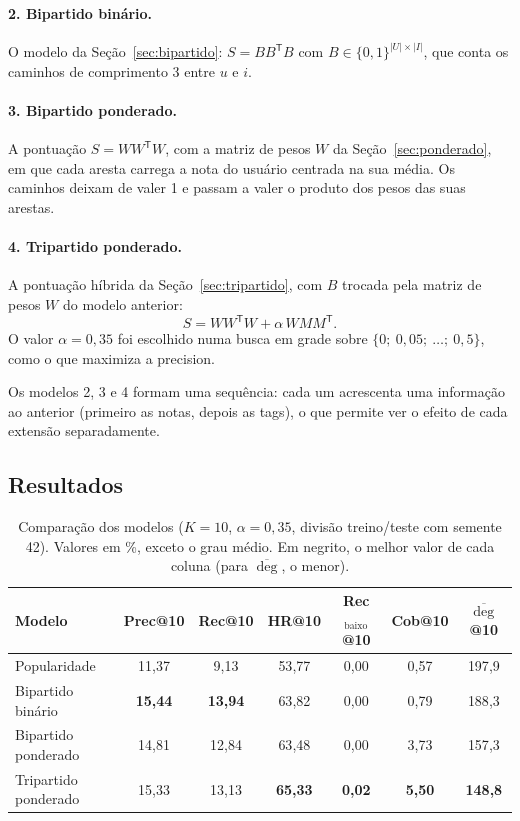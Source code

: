 \documentclass[12pt,a4paper]{article}
\theoremstyle{definition}
\begin{document}
\paragraph{2. Bipartido binário.}
O modelo da Seção~\ref{sec:bipartido}: $S = BB^{\mathsf T}B$ com
$B \in \{0,1\}^{|U| \times |I|}$, que conta os caminhos de comprimento 3
entre $u$ e $i$.

\paragraph{3. Bipartido ponderado.}
A pontuação $S = WW^{\mathsf T}W$, com a matriz de pesos $W$ da
Seção~\ref{sec:ponderado}, em que cada aresta carrega a nota do usuário
centrada na sua média. Os caminhos deixam de valer 1 e passam a valer o
produto dos pesos das suas arestas.

\paragraph{4. Tripartido ponderado.}
A pontuação híbrida da Seção~\ref{sec:tripartido}, com $B$ trocada pela
matriz de pesos $W$ do modelo anterior:
\[
  S = WW^{\mathsf T}W + \alpha\, WMM^{\mathsf T}.
\]
O valor $\alpha = 0{,}35$ foi escolhido numa busca em grade sobre
$\{0;\ 0{,}05;\ \dots;\ 0{,}5\}$, como o que maximiza a precision.

\medskip
Os modelos 2, 3 e 4 formam uma sequência: cada um acrescenta uma
informação ao anterior (primeiro as notas, depois as tags), o que permite
ver o efeito de cada extensão separadamente.

\subsection{Resultados}\label{sec:resultados}

\begin{table}[ht]
\centering
\small
\begin{tabular}{lcccccc}
\toprule
Modelo & Prec@10 & Rec@10 & HR@10 & Rec$_{\text{baixo}}$@10 & Cob@10 & $\overline{\deg}$@10 \\
\midrule
Popularidade          & 11{,}37 &  9{,}13 & 53{,}77 & 0{,}00 & 0{,}57 & 197{,}9 \\
Bipartido binário     & \textbf{15{,}44} & \textbf{13{,}94} & 63{,}82 & 0{,}00 & 0{,}79 & 188{,}3 \\
Bipartido ponderado   & 14{,}81 & 12{,}84 & 63{,}48 & 0{,}00 & 3{,}73 & 157{,}3 \\
Tripartido ponderado  & 15{,}33 & 13{,}13 & \textbf{65{,}33} & \textbf{0{,}02} & \textbf{5{,}50} & \textbf{148{,}8} \\
\bottomrule
\end{tabular}
\caption{Comparação dos modelos ($K = 10$, $\alpha = 0{,}35$, divisão
treino/teste com semente 42). Valores em \%, exceto o grau médio. Em
negrito, o melhor valor de cada coluna (para $\overline{\deg}$, o menor).}
\label{tab:avaliacao}
\end{table}
\end{document}
